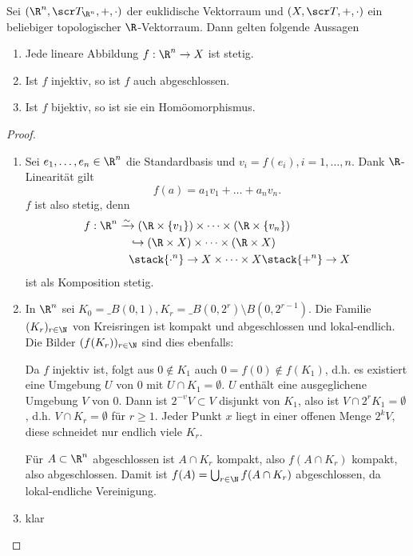 \begin{st}
	Sei $(\R^n, \scr T_{\R^n}, +, \cdot)$ der euklidische Vektorraum und $(X, \scr T, +, \cdot)$ ein beliebiger topologischer $\R$-Vektorraum.
	Dann gelten folgende Aussagen
	\begin{enumerate}[1)]
		\item
			Jede lineare Abbildung $f: \R^n \to X$ ist stetig.
		\item
			Ist $f$ injektiv, so ist $f$ auch abgeschlossen.
		\item
			Ist $f$ bijektiv, so ist sie ein Homöomorphismus.
	\end{enumerate}
	\begin{proof}
		\begin{enumerate}[(1)]
			\item
				Sei $e_1, \dotsc, e_n \in \R^n$ die Standardbasis und $v_i = f(e_i), i=1, \dotsc, n$.
				Dank $\R$-Linearität gilt
				\[
					f(a) = a_1 v_1 + \dotsc + a_n v_n.
				\]
				$f$ ist also stetig, denn
				\begin{align*}
					f:
					\R^n &\homto (\R \times \{v_1\}) \times \dotsb \times (\R \times \{v_n\}) \\
					&\quad\injto (\R \times X) \times \dotsb \times (\R \times X) \\
					&\quad\stack{\cdot^n}\to X \times \dotsb \times X
					\stack{+^n}\to X
				\end{align*}
				ist als Komposition stetig.
			\item
				In $\R^n$ sei $K_0 = \_B(0,1), K_r = \_B(0,2^r) \setminus B(0,2^{r-1})$.
				Die Familie $(K_r)_{r\in\N}$ von Kreisringen ist kompakt und abgeschlossen und lokal-endlich.
				Die Bilder $(f(K_r))_{r\in\N}$ sind dies ebenfalls:

				Da $f$ injektiv ist, folgt aus $0 \not\in K_1$ auch $0 = f(0) \not\in f(K_1)$, d.h. es existiert eine Umgebung $U$ von $0$ mit $U \cap K_1 = \emptyset$.
				$U$ enthält eine ausgeglichene Umgebung $V$ von $0$.
				Dann ist $2^{-v}V \subset V$ disjunkt von $K_1$, also ist $V \cap 2^r K_1 = \emptyset$, d.h. $V \cap K_r = \emptyset$ für $r \ge 1$.
				Jeder Punkt $x$ liegt in einer offenen Menge $2^k V$, diese schneidet nur endlich viele $K_r$.

				Für $A \subset \R^n$ abgeschlossen ist $A \cap K_r$ kompakt, also $f(A \cap K_r)$ kompakt, also abgeschlossen.
				Damit ist $f(A) = \bigcup_{r\in\N} f(A \cap K_r)$ abgeschlossen, da lokal-endliche Vereinigung.
			\item
				klar
		\end{enumerate}
	\end{proof}
\end{st}


